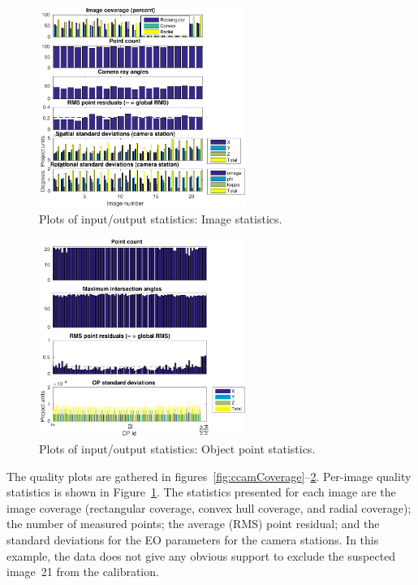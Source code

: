 \documentclass{article}
\begin{document}
\begin{figure}[tbp]
\centering
\includegraphics[width=0.6\textwidth]{./ill/ccamimstats.pdf}
\caption{\label{fig:ccamImstats}
Plots of input/output statistics: Image statistics.}
\end{figure}

\begin{figure}[tbp]
\centering
\includegraphics[width=0.6\textwidth]{./ill/ccamopstats.pdf}
\caption{\label{fig:ccamOPstats}
Plots of input/output statistics: Object point statistics.}
\end{figure}

The quality plots are gathered in
figures~\ref{fig:ccamCoverage}--\ref{fig:ccamOPstats}. Per-image quality
statistics is shown in Figure~\ref{fig:ccamImstats}. The statistics
presented for each image are the image coverage (rectangular coverage,
convex hull coverage, and radial coverage); the number of measured
points; the average (RMS) point residual; and the standard deviations
for the EO parameters for the camera stations. In this example, the
data does not give any obvious support to exclude the suspected
image~21 from the calibration.
\end{document}
